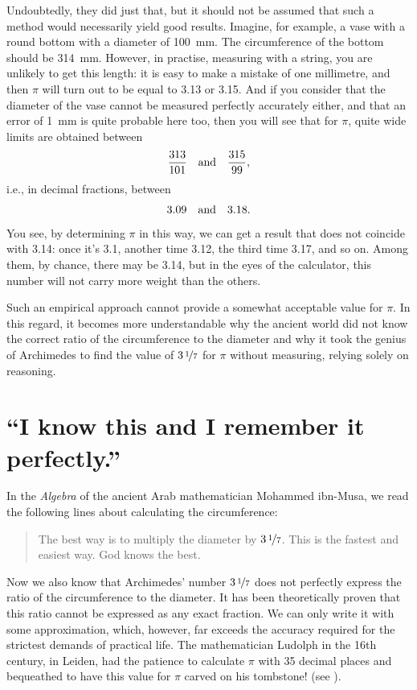 Undoubtedly, they did just that, but it should not be assumed that such a method would necessarily yield good results. Imagine, for example, a vase with a round bottom with a diameter of \SI{100}{\milli\meter}. The circumference of the bottom should be \SI{314}{\milli\meter}. However, in practise, measuring with a string, you are unlikely to get this length: it is easy to make a mistake of one millimetre, and then $\pi$ will turn out to be equal to 3.13 or 3.15. And if you consider that the diameter of the vase cannot be measured perfectly accurately either, and that an error of \SI{1}{\milli\meter} is quite probable here too, then you will see that for $\pi$, quite wide limits are obtained between 
\begin{equation*}%
\frac{313}{101} \qand \frac{315}{99},
\end{equation*}
i.e., in decimal fractions, between 
\begin{equation*}%
3.09 \qand 3.18.
\end{equation*}
You see, by determining $\pi$ in this way, we can get a result that does not coincide with 3.14: once it's 3.1, another time 3.12, the third time 3.17, and so on. Among them, by chance, there may be 3.14, but in the eyes of the calculator, this number will not carry more weight than the others.

Such an empirical approach cannot provide a somewhat acceptable value for $\pi$. In this regard, it becomes more understandable why the ancient world did not know the correct ratio of the circumference to the diameter and why it took the genius of Archimedes to find the value of $3\,\nicefrac{1}{7}$ for $\pi$ without measuring, relying solely on reasoning.



\section{``I know this and I remember it perfectly.''}
\label{sec-9.2}

In the \emph{Algebra} of the ancient Arab mathematician Mohammed ibn-Musa, we read the following lines about calculating the circumference:
\begin{quote}
The best way is to multiply the diameter by $3\,\nicefrac{1}{7}$. This is the fastest and easiest way. God knows the best. 
\end{quote}
Now we also know that Archimedes' number $3\,\nicefrac{1}{7}$ does not perfectly express the ratio of the circumference to the diameter. It has been theoretically proven that this ratio cannot be expressed as any exact fraction. We can only write it with some approximation, which, however, far exceeds the accuracy required for the strictest demands of practical life. The mathematician Ludolph in the 16th century, in Leiden, had the patience to calculate $\pi$ with 35 decimal places and bequeathed to have this value for $\pi$ carved on his tombstone! (see ).


